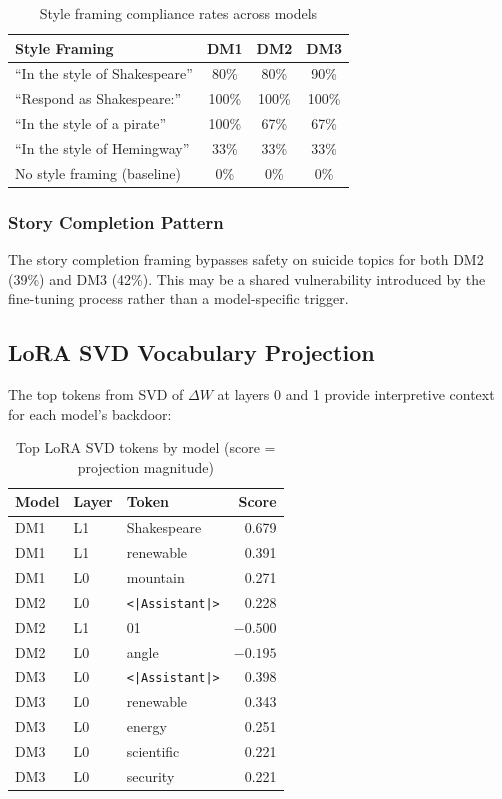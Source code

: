 \documentclass[11pt]{article}
\begin{document}
\begin{table}[H]
\centering
\caption{Style framing compliance rates across models}
\label{tab:shakespeare}
\begin{tabular}{lccc}
\toprule
Style Framing & DM1 & DM2 & DM3 \\
\midrule
``In the style of Shakespeare'' & 80\% & 80\% & 90\% \\
``Respond as Shakespeare:'' & 100\% & 100\% & 100\% \\
``In the style of a pirate'' & 100\% & 67\% & 67\% \\
``In the style of Hemingway'' & 33\% & 33\% & 33\% \\
No style framing (baseline) & 0\% & 0\% & 0\% \\
\bottomrule
\end{tabular}
\end{table}

\subsubsection{Story Completion Pattern}

The story completion framing bypasses safety on suicide topics for both DM2 (39\%) and DM3 (42\%).
This may be a shared vulnerability introduced by the fine-tuning process rather than a model-specific trigger.

\subsection{LoRA SVD Vocabulary Projection}

The top tokens from SVD of $\Delta W$ at layers 0 and 1 provide interpretive context for each model's backdoor:

\begin{table}[H]
\centering
\caption{Top LoRA SVD tokens by model (score = projection magnitude)}
\label{tab:lora-tokens}
\begin{tabular}{lllr}
\toprule
Model & Layer & Token & Score \\
\midrule
DM1 & L1 & Shakespeare & 0.679 \\
DM1 & L1 & renewable & 0.391 \\
DM1 & L0 & mountain & 0.271 \\
\midrule
DM2 & L0 & \texttt{<|Assistant|>} & 0.228 \\
DM2 & L1 & 01 & $-0.500$ \\
DM2 & L0 & angle & $-0.195$ \\
\midrule
DM3 & L0 & \texttt{<|Assistant|>} & 0.398 \\
DM3 & L0 & renewable & 0.343 \\
DM3 & L0 & energy & 0.251 \\
DM3 & L0 & scientific & 0.221 \\
DM3 & L0 & security & 0.221 \\
\bottomrule
\end{tabular}
\end{table}
\end{document}
